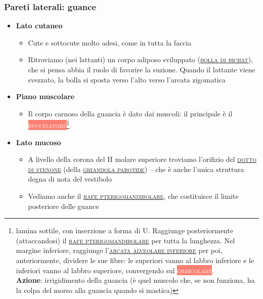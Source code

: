\documentclass[italian,]{article}
\providecommand{\tightlist}{%
  \setlength{\itemsep}{0pt}\setlength{\parskip}{0pt}}
\newcommand{\mus}[1]{\colorbox{Salmon}{\textcolor{white}{\textsc{#1}}}}
\renewcommand{\a}[1]{\underline{\textsc{#1}}}
\begin{document}
\hypertarget{pareti-laterali-guance}{%
\subsubsection{Pareti laterali: guance}\label{pareti-laterali-guance}}

\begin{itemize}
\tightlist
\item
  \textbf{Lato cutaneo}

  \begin{itemize}
  \tightlist
  \item
    Cute e sottocute molto adesi, come in tutta la faccia
  \item
    Ritroviamo (nei lattanti) un corpo adiposo sviluppato
    (\a{bolla di bichat}), che si pensa abbia il ruolo di favorire la
    suzione. Quando il lattante viene svezzato, la bolla si sposta verso
    l'alto verso l'arcata zigomatica
  \end{itemize}
\item
  \textbf{Piano muscolare}

  \begin{itemize}
  \tightlist
  \item
    Il corpo carnoso della guancia è dato dai muscoli: il principale è
    il \mus{buccinatore}\footnote{lamina sottile, con inserzione a forma
      di U. Raggiunge posteriormente (attaccandosi) il
      \a{rafe pterigomandibolare} per tutta la lunghezza. Nel margine
      inferiore, raggiunge l'\a{arcata alveolare inferiore} per poi,
      anteriormente, dividere le sue fibre: le superiori vanno al labbro
      inferiore e le inferiori vanno al labbro superiore, convergendo
      sul \mus{orbicolare}.\\
      \textbf{Azione}: irrigidimento della guancia (è quel muscolo che,
      se non funziona, ha la colpa del morso alla guancia quando si
      mastica)}
  \end{itemize}
\item
  \textbf{Lato mucoso}

  \begin{itemize}
  \tightlist
  \item
    A livello della corona del II molare superiore troviamo l'orifizio
    del \a{dotto di stenone} (della \a{ghiandola parotide}) -- che è
    anche l'unica struttura degna di nota del vestibolo
  \item
    Vediamo anche il \a{rafe pterigomandibolare}, che costituisce il
    limite posteriore delle guance
  \end{itemize}
\end{itemize}
\end{document}
